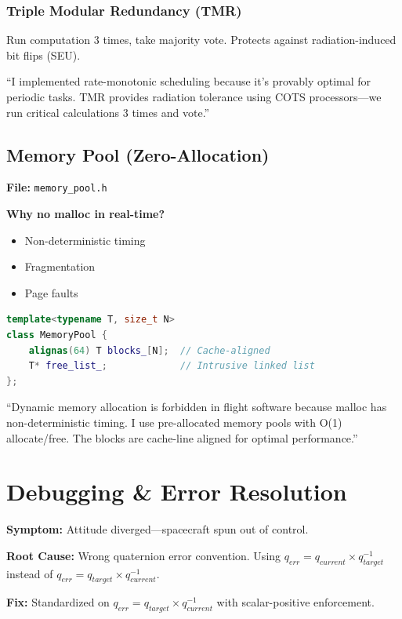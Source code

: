 \documentclass[11pt,a4paper]{article}
\begin{document}
\subsubsection{Triple Modular Redundancy (TMR)}

Run computation 3 times, take majority vote. Protects against radiation-induced bit flips (SEU).

\begin{interviewanswer}
``I implemented rate-monotonic scheduling because it's provably optimal for periodic tasks. TMR provides radiation tolerance using COTS processors---we run critical calculations 3 times and vote.''
\end{interviewanswer}

\subsection{Memory Pool (Zero-Allocation)}

\textbf{File:} \texttt{memory\_pool.h}

\textbf{Why no malloc in real-time?}
\begin{itemize}[noitemsep]
    \item Non-deterministic timing
    \item Fragmentation
    \item Page faults
\end{itemize}

\begin{lstlisting}[language=C++]
template<typename T, size_t N>
class MemoryPool {
    alignas(64) T blocks_[N];  // Cache-aligned
    T* free_list_;             // Intrusive linked list
};
\end{lstlisting}

\begin{interviewanswer}
``Dynamic memory allocation is forbidden in flight software because malloc has non-deterministic timing. I use pre-allocated memory pools with O(1) allocate/free. The blocks are cache-line aligned for optimal performance.''
\end{interviewanswer}

\section{Debugging \& Error Resolution}

\begin{errorbox}[title=\faExclamationTriangle~Error 1: PD Controller Sign Error]
\textbf{Symptom:} Attitude diverged---spacecraft spun out of control.

\textbf{Root Cause:} Wrong quaternion error convention. Using $q_{err} = q_{current} \times q_{target}^{-1}$ instead of $q_{err} = q_{target} \times q_{current}^{-1}$.

\textbf{Fix:} Standardized on $q_{err} = q_{target} \times q_{current}^{-1}$ with scalar-positive enforcement.
\end{errorbox}
\end{document}
